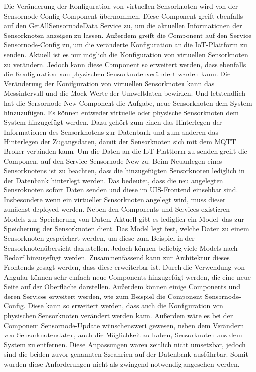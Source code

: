 Die Veränderung der Konfiguration von virtuellen Sensorknoten wird von der Sensornode-Config-Component übernommen. Diese Component greift ebenfalls auf den GetAllSensornodeData Service zu, um die aktuellen Informationen der Sensorknoten anzeigen zu lassen. Außerdem greift die Component auf den Service Sensornode-Config zu, um die veränderte Konfiguration an die IoT-Plattform zu senden. Aktuell ist es nur möglich die Konfiguration von virtuellen Sensorknoten zu verändern. Jedoch kann diese Component so erweitert werden, dass ebenfalls die Konfiguration von physischen Sensorknotenverändert werden kann. Die Veränderung der Konifguration von virtuellen Sensorknoten kann das Messintervall und die Mock Werte der Umweltdaten bewirken. \newline 
Und letztendlich hat die Sensornode-New-Component die Aufgabe, neue Sensorknoten dem System hinzuzufügen. Es können entweder virtuelle oder physische Sensorknoten dem System hinzugefügt werden. Dazu gehört zum einen das Hinterlegen der Informationen des Sensorknotens zur Datenbank und zum anderen das Hinterlegen der Zugangsdaten, damit der Sensorknoten sich mit dem MQTT Broker verbinden kann. Um die Daten an die IoT-Plattform zu senden greift die Component auf den Service Sensornode-New zu. Beim Neuanlegen eines Sensorknotens ist zu beachten, dass die hinzugefügten Sensorknoten lediglich in der Datenbank hinterlegt werden. Das bedeutet, dass die neu angelegten Sensroknoten sofort Daten senden und diese im UIS-Frontend einsehbar sind. Insbesondere wenn ein virtueller Sensorknoten angelegt wird, muss dieser zunächst deployed werden. \newline
Neben den Components und Services existieren Models zur Speicherung von Daten. Aktuell gibt es lediglich ein Model, das zur Speicherung der Sensorknoten dient. Das Model legt fest, welche Daten zu einem Sensorknoten gespeichert werden, um diese zum Beispiel in der Sensorknotenübersicht dazustellen. Jedoch können beliebig viele Models nach Bedarf hinzugefügt werden. \newline
Zusammenfassend kann zur Architektur dieses Frontends gesagt werden, dass diese erweiterbar ist. Durch die Verwendung von Angular können sehr einfach neue Components hinzugefügt werden, die eine neue Seite auf der Oberfläche darstellen. Außerdem können einige Components und deren Services erweitert werden, wie zum Beispiel die Component Sensornode-Config. Diese kann so erweitert werden, dass auch die Konfiguration von physischen Sensorknoten verändert werden kann. Außerdem wäre es bei der Component Sensornode-Update wünschenswert gewesen, neben dem Verändern von Sensorknotendaten, auch die Möglichkeit zu haben, Sensorknoten aus dem System zu entfernen. Diese Anpassungen waren zeitlich nicht umsetzbar, jedoch sind die beiden zuvor genannten Szeanrien auf der Datenbank ausführbar. Somit wurden diese Anforderungen nicht als zwingend notwendig angesehen werden. 

